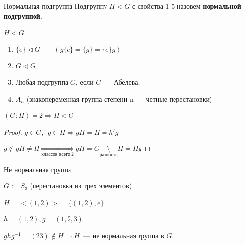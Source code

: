 \begin{Definition}{Нормальная подгруппа}{}
    Подгруппу $H < G$ с свойства 1-5 назовем \textbf{нормальной подгруппой}.

    $H \vartriangleleft G$
\end{Definition}

\begin{Example}{}{}
    \begin{enumerate}
        \item $\{e\} \vartriangleleft G \qquad (g\{e\} = \{g\} = \{e\}g)$
        \item $G \vartriangleleft G$
        \item Любая подгруппа $G$, если $G$~--- Абелева.
        \item $A_n$ (знакопеременная группа степени n~--- четные перестановки)
    \end{enumerate}
\end{Example}

\begin{Lemma}{}{}
    $(G:H) = 2 \Rightarrow H \vartriangleleft G$
\end{Lemma}

\begin{proof}

    $g \in G, \ \ g \in H \Rightarrow gH = H = h'g$

    $g \not \in gH \not = H \underset{\text{классов всего 2}}{\Rightarrow} gH = G \underset{\text{разность}}{\setminus} H = Hg$
\end{proof}

\begin{Example}{Не нормальная группа}{}

    $G := S_3$ (перестановки из трех элементов)

    $H = <(1, 2)> = \{(1,2),e\}$

    $h = (1, 2), g = (1, 2, 3)$

    $ghg^{-1} = (23) \not \in H \Rightarrow H$~--- не нормальная группа в $G$.

\end{Example}
